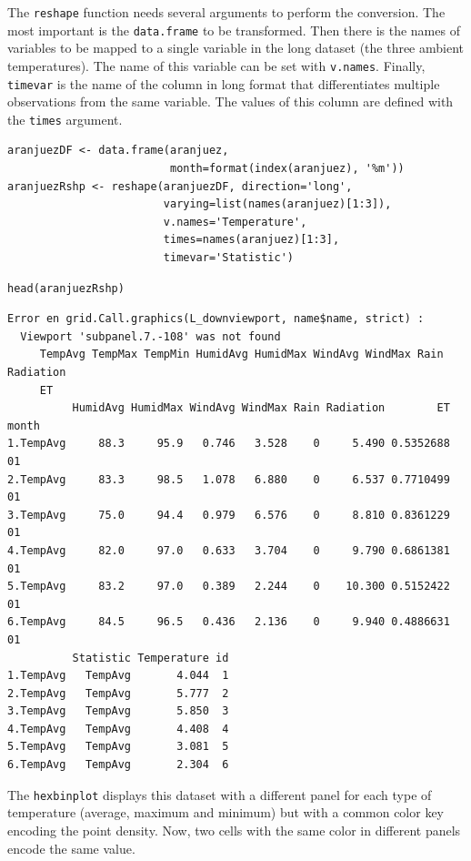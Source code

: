 The \texttt{reshape} function needs several arguments to perform the
conversion. The most important is the \texttt{data.frame} to be
transformed. Then there is the names of variables to be mapped to
a single variable in the long dataset (the three ambient
temperatures). The name of this variable can be set with
\texttt{v.names}. Finally, \texttt{timevar} is the name of the column in long format that
differentiates multiple observations from the same variable. The
values of this column are defined with the \texttt{times} argument.


\lstset{language=R}
\begin{lstlisting}
aranjuezDF <- data.frame(aranjuez,
                         month=format(index(aranjuez), '%m'))
aranjuezRshp <- reshape(aranjuezDF, direction='long',
                        varying=list(names(aranjuez)[1:3]),
                        v.names='Temperature',
                        times=names(aranjuez)[1:3],
                        timevar='Statistic')
\end{lstlisting}


\lstset{language=R}
\begin{lstlisting}
head(aranjuezRshp)
\end{lstlisting}


\begin{verbatim}
Error en grid.Call.graphics(L_downviewport, name$name, strict) : 
  Viewport 'subpanel.7.-108' was not found
     TempAvg TempMax TempMin HumidAvg HumidMax WindAvg WindMax Rain Radiation
     ET
          HumidAvg HumidMax WindAvg WindMax Rain Radiation        ET month
1.TempAvg     88.3     95.9   0.746   3.528    0     5.490 0.5352688    01
2.TempAvg     83.3     98.5   1.078   6.880    0     6.537 0.7710499    01
3.TempAvg     75.0     94.4   0.979   6.576    0     8.810 0.8361229    01
4.TempAvg     82.0     97.0   0.633   3.704    0     9.790 0.6861381    01
5.TempAvg     83.2     97.0   0.389   2.244    0    10.300 0.5152422    01
6.TempAvg     84.5     96.5   0.436   2.136    0     9.940 0.4886631    01
          Statistic Temperature id
1.TempAvg   TempAvg       4.044  1
2.TempAvg   TempAvg       5.777  2
3.TempAvg   TempAvg       5.850  3
4.TempAvg   TempAvg       4.408  4
5.TempAvg   TempAvg       3.081  5
6.TempAvg   TempAvg       2.304  6
\end{verbatim}

The \texttt{hexbinplot} displays this dataset with a different panel for
each type of temperature (average, maximum and minimum) but with a
common color key encoding the point density. Now, two cells with
the same color in different panels encode the same value.

